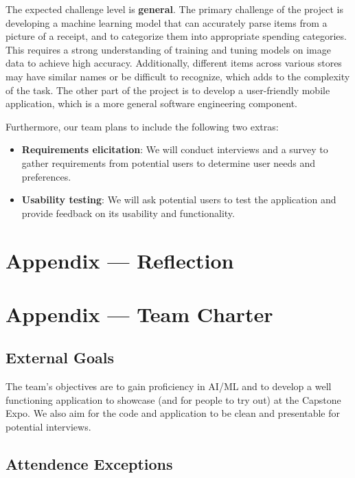 \documentclass{article}
\begin{document}
The expected challenge level is \textbf{general}. The primary challenge of the
project is developing a machine learning model that can accurately parse items
from a picture of a receipt, and to categorize them into appropriate spending
categories. This requires a strong understanding of training and tuning models
on image data to achieve high accuracy. Additionally, different items across
various stores may have similar names or be difficult to recognize, which adds
to the complexity of the task. The other part of the project is to develop a
user-friendly mobile application, which is a more general software engineering
component.

Furthermore, our team plans to include the following two extras:
\begin{itemize}
    \item \textbf{Requirements elicitation}: We will conduct interviews and a
    survey to gather requirements from potential users to determine user needs
    and preferences.
    \item \textbf{Usability testing}: We will ask potential users to test the
    application and provide feedback on its usability and functionality.

\end{itemize}

\newpage{}

\section{Appendix --- Reflection}



\section{Appendix --- Team Charter}

\subsection{External Goals}

The team's objectives are to gain proficiency in AI/ML and to develop a well functioning application to showcase (and for people to try out) at the Capstone Expo. We also aim for the code and application to be clean and presentable for potential interviews.

\subsection{Attendence Exceptions}
\end{document}
